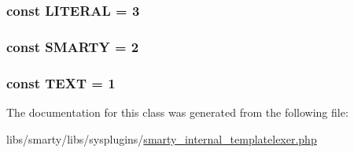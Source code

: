 \subsubsection[{L\+I\+T\+E\+R\+A\+L}]{\setlength{\rightskip}{0pt plus 5cm}const L\+I\+T\+E\+R\+A\+L = 3}\label{class_smarty___internal___templatelexer_af67e1d30de8b754b676c047149f0cc8a}
\hypertarget{class_smarty___internal___templatelexer_aa641d1ecbdfabeefef1870d990c9fa3f}{}
\subsubsection[{S\+M\+A\+R\+T\+Y}]{\setlength{\rightskip}{0pt plus 5cm}const S\+M\+A\+R\+T\+Y = 2}\label{class_smarty___internal___templatelexer_aa641d1ecbdfabeefef1870d990c9fa3f}
\hypertarget{class_smarty___internal___templatelexer_a653f16b93fcf9478a4317617e95b01d2}{}
\subsubsection[{T\+E\+X\+T}]{\setlength{\rightskip}{0pt plus 5cm}const T\+E\+X\+T = 1}\label{class_smarty___internal___templatelexer_a653f16b93fcf9478a4317617e95b01d2}


The documentation for this class was generated from the following file\+:\begin{DoxyCompactItemize}
\item 
libs/smarty/libs/sysplugins/\hyperlink{smarty__internal__templatelexer_8php}{smarty\+\_\+internal\+\_\+templatelexer.\+php}\end{DoxyCompactItemize}
